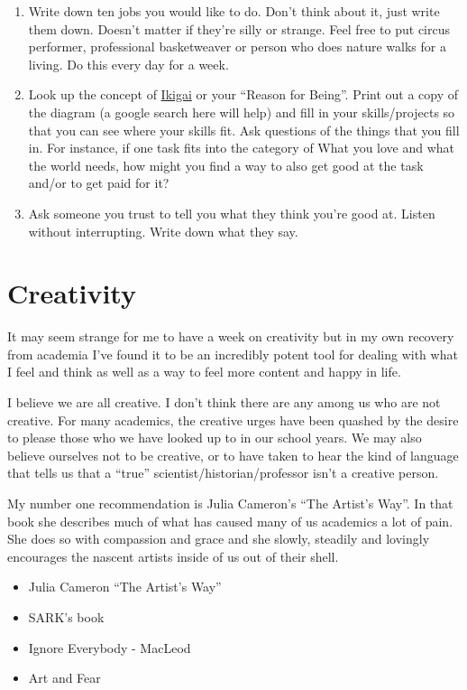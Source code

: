 \documentclass[]{book}
\providecommand{\tightlist}{%
  \setlength{\itemsep}{0pt}\setlength{\parskip}{0pt}}
\theoremstyle{definition}
\theoremstyle{definition}
\theoremstyle{definition}
\theoremstyle{remark}
\begin{document}
\begin{enumerate}
\def\labelenumi{\arabic{enumi}.}
\tightlist
\item
  Write down ten jobs you would like to do. Don't think about it, just
  write them down. Doesn't matter if they're silly or strange. Feel free
  to put circus performer, professional basketweaver or person who does
  nature walks for a living. Do this every day for a week.
\item
  Look up the concept of
  \href{https://en.wikipedia.org/wiki/Ikigai}{Ikigai} or your ``Reason
  for Being''. Print out a copy of the diagram (a google search here
  will help) and fill in your skills/projects so that you can see where
  your skills fit. Ask questions of the things that you fill in. For
  instance, if one task fits into the category of What you love and what
  the world needs, how might you find a way to also get good at the task
  and/or to get paid for it?\\
\item
  Ask someone you trust to tell you what they think you're good at.
  Listen without interrupting. Write down what they say.
\end{enumerate}

\chapter{Creativity}\label{creativity}

It may seem strange for me to have a week on creativity but in my own
recovery from academia I've found it to be an incredibly potent tool for
dealing with what I feel and think as well as a way to feel more content
and happy in life.

I believe we are all creative. I don't think there are any among us who
are not creative. For many academics, the creative urges have been
quashed by the desire to please those who we have looked up to in our
school years. We may also believe ourselves not to be creative, or to
have taken to hear the kind of language that tells us that a ``true''
scientist/historian/professor isn't a creative person.

My number one recommendation is Julia Cameron's ``The Artist's Way''. In
that book she describes much of what has caused many of us academics a
lot of pain. She does so with compassion and grace and she slowly,
steadily and lovingly encourages the nascent artists inside of us out of
their shell.

\begin{itemize}
\tightlist
\item
  Julia Cameron ``The Artist's Way''
\item
  SARK's book
\item
  Ignore Everybody - MacLeod
\item
  Art and Fear
\end{itemize}
\end{document}
